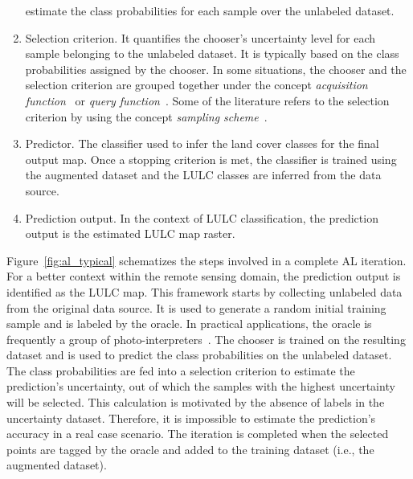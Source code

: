 \documentclass[parskip=full]{scrartcl}
\begin{document}
\begin{enumerate}
        estimate the class probabilities for each sample over the unlabeled
        dataset.
    \item Selection criterion. It quantifies the chooser's uncertainty level for
        each sample belonging to the unlabeled dataset. It is typically based on
        the class probabilities assigned by the chooser. In some situations, the
        chooser and the selection criterion are grouped together under the
        concept \textit{acquisition function}~\cite{Ruzicka2020} or
        \textit{query function}~\cite{Su2020}. Some of the literature refers to
        the selection criterion by using the concept \textit{sampling
        scheme}~\cite{Liu2020}.
    \item Predictor. The classifier used to infer the land cover classes for the
        final output map. Once a stopping criterion is met, the classifier is
        trained using the augmented dataset and the LULC classes are inferred
        from the data source.
    \item Prediction output. In the context of LULC classification, the
        prediction output is the estimated LULC map raster.
\end{enumerate}

Figure~\ref{fig:al_typical} schematizes the steps involved in a complete AL
iteration. For a better context within the remote sensing domain, the prediction
output is identified as the LULC map. This framework starts by collecting
unlabeled data from the original data source. It is used to generate a random
initial training sample and is labeled by the oracle. In practical applications,
the oracle is frequently a group of photo-interpreters~\cite{Kottke2017}. The
chooser is trained on the resulting dataset and is used to predict the class
probabilities on the unlabeled dataset. The class probabilities are fed into a
selection criterion to estimate the prediction's uncertainty, out of which the
samples with the highest uncertainty will be selected. This calculation is
motivated by the absence of labels in the uncertainty dataset. Therefore, it is
impossible to estimate the prediction's accuracy in a real case scenario. The
iteration is completed when the selected points are tagged by the oracle and
added to the training dataset (i.e., the augmented dataset). 
\end{document}
